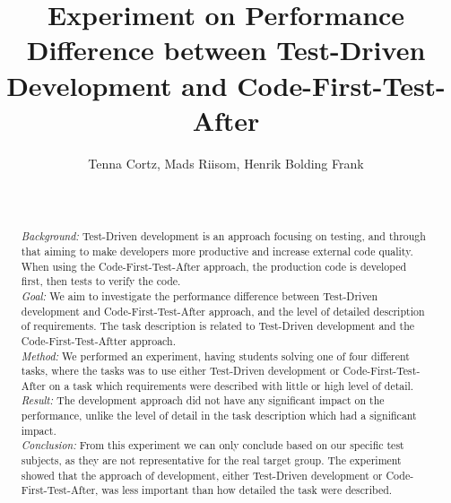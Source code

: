 \documentclass{sig-alternate-05-2015}
\begin{document}
	

\title{Experiment on Performance Difference between Test-Driven Development and Code-First-Test-After}

\author{
\alignauthor
Tenna Cortz, Mads Riisom, Henrik Bolding Frank\\
 \\
 \\
}


\maketitle
\begin{abstract}
 \textit{Background:} Test-Driven development is an approach focusing on testing, and through that aiming to make developers more productive and increase external code quality. When using the Code-First-Test-After approach, the production code is developed first, then tests to verify the code.\\
[0.0em]
 \textit{Goal:} We aim to investigate the performance difference between Test-Driven development and Code-First-Test-After approach, and the level of detailed description of requirements. The task description is related to Test-Driven development and the Code-First-Test-Aftter approach.\\
[0.0em]
 \textit{Method:} We performed an experiment, having students solving one of four different tasks, where the tasks was to use either Test-Driven development or Code-First-Test-After on a task which requirements were described with little or high level of detail.\\
[0.0em]
 \textit{Result:} The development approach did not have any significant impact on the performance, unlike the level of detail in the task description which had a significant impact.\\
[0.0em]
 \textit{Conclusion:} From this experiment we can only conclude based on our specific test subjects, as they are not representative for the real target group. The experiment showed that the approach of development, either Test-Driven development or Code-First-Test-After, was less important than how detailed the task were described.

\end{abstract}
\end{document}

